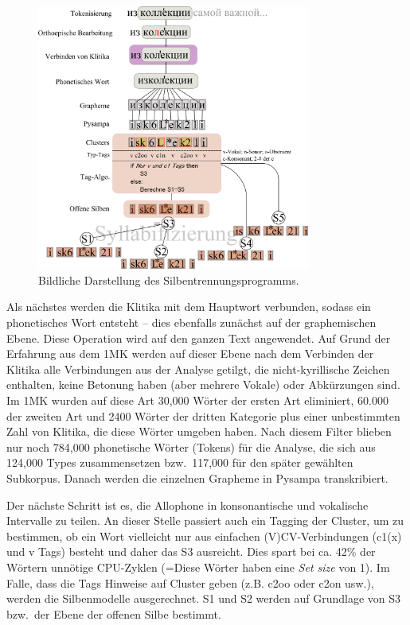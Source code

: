 \documentclass[12pt,headsepline,a4paper]{scrartcl}
\begin{document}
\begin{figure}[htbp]
\centering 
\includegraphics[width=0.8\textwidth]{figures/syllaru_system.png}
\caption{Bildliche Darstellung des Silbentrennungsprogramms.}
\label{fig: syl_sys}
\end{figure}

Als nächstes werden die Klitika mit dem Hauptwort verbunden, sodass ein phonetisches Wort entsteht -- dies ebenfalls zunächst auf der graphemischen Ebene. Diese Operation wird auf den ganzen Text angewendet. 
Auf Grund der Erfahrung aus dem 1MK werden auf dieser Ebene nach dem Verbinden der Klitika alle Verbindungen aus der Analyse getilgt, die nicht-kyrillische Zeichen enthalten, keine Betonung haben (aber mehrere Vokale) oder Abkürzungen sind. Im 1MK wurden auf diese Art 30,000 Wörter der ersten Art eliminiert, 60.000 der zweiten Art und 2400 Wörter der dritten Kategorie plus einer unbestimmten Zahl von Klitika, die diese Wörter umgeben haben. Nach diesem Filter blieben nur noch 784,000 phonetische Wörter (Tokens) für die Analyse, die sich aus 124,000 Types zusammensetzen bzw.\ 117,000 für den später gewählten Subkorpus.
Danach werden die einzelnen Grapheme in Pysampa transkribiert. 

Der nächste Schritt ist es, die Allophone in konsonantische und vokalische Intervalle zu teilen. 
An dieser Stelle passiert auch ein Tagging der Cluster, um zu bestimmen, ob ein Wort vielleicht nur aus einfachen (V)CV-Verbindungen (c1(x) und v Tags) besteht und daher das S3 ausreicht. Dies spart bei ca. 42\% der Wörtern unnötige CPU-Zyklen (=Diese Wörter haben eine \textit{Set size} von 1).
Im Falle, dass die Tags Hinweise auf Cluster geben (z.B. c2oo oder c2on usw.), werden die Silbenmodelle ausgerechnet. S1 und S2 werden auf Grundlage von S3 bzw.\ der Ebene der offenen Silbe bestimmt.
\end{document}
